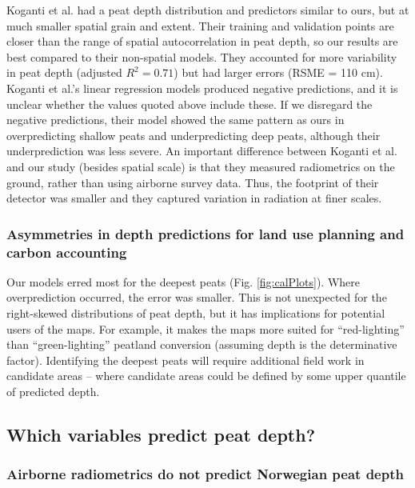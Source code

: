 \documentclass[soil, manuscript]{copernicus}
\begin{document}
Koganti et al. \citeyearpar{kogantiMappingPeatDepth2023} had a peat depth distribution and predictors similar to ours, but at much smaller spatial grain and extent.
Their training and validation points are closer than the range of spatial autocorrelation in peat depth, so our results are best compared to their non-spatial models.
They accounted for more variability in peat depth (adjusted \(R^2 = 0.71\)) but had larger errors (RSME = 110 cm).
Koganti et al.'s \citeyearpar{kogantiMappingPeatDepth2023} linear regression models produced negative predictions, and it is unclear whether the values quoted above include these.
If we disregard the negative predictions, their model showed the same pattern as ours in overpredicting shallow peats and underpredicting deep peats, although their underprediction was less severe.
An important difference between Koganti et al. \citeyearpar{kogantiMappingPeatDepth2023} and our study (besides spatial scale) is that they measured radiometrics on the ground, rather than using airborne survey data.
Thus, the footprint of their detector was smaller and they captured variation in radiation at finer scales.

\subsubsection{Asymmetries in depth predictions for land use planning and carbon accounting}

Our models erred most for the deepest peats (Fig. \ref{fig:calPlots}).
Where overprediction occurred, the error was smaller.
This is not unexpected for the right-skewed distributions of peat depth, but it has implications for potential users of the maps.
For example, it makes the maps more suited for ``red-lighting'' than ``green-lighting'' peatland conversion (assuming depth is the determinative factor).
Identifying the deepest peats will require additional field work in candidate areas -- where candidate areas could be defined by some upper quantile of predicted depth.

\subsection{Which variables predict peat depth?}

\subsubsection{Airborne radiometrics do not predict Norwegian peat depth}
\end{document}
